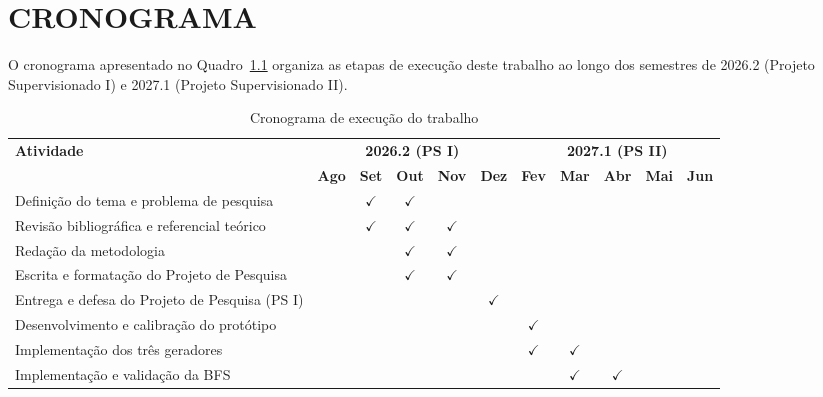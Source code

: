 \chapter{CRONOGRAMA}
\label{cap:cronograma}

O cronograma apresentado no Quadro~\ref{qua:cronograma} organiza as etapas de 
execução deste trabalho ao longo dos semestres de 2026.2 
(Projeto Supervisionado I) e 2027.1 (Projeto Supervisionado II).

\begin{table}[htb]
\caption{Cronograma de execução do trabalho}
\label{qua:cronograma}

\renewcommand{\arraystretch}{1.4}
\begin{tabularx}{\textwidth}{|X|c|c|c|c|c|c|c|c|c|c|}
  \hline
  \multirow{2}{*}{\textbf{Atividade}} &
  \multicolumn{5}{c|}{\textbf{2026.2 (PS I)}} &
  \multicolumn{5}{c|}{\textbf{2027.1 (PS II)}} \\
  \cline{2-11}
  & \textbf{Ago} & \textbf{Set} & \textbf{Out} & \textbf{Nov} & \textbf{Dez}
  & \textbf{Fev} & \textbf{Mar} & \textbf{Abr} & \textbf{Mai} & \textbf{Jun} \\
  \hline

  Definição do tema e problema de pesquisa
  & & $\checkmark$ & $\checkmark$  & & & & & & & \\
  \hline

  Revisão bibliográfica e referencial teórico
  & & $\checkmark$ & $\checkmark$ & $\checkmark$ & & & & & & \\
  \hline

  Redação da metodologia
  & & & $\checkmark$ & $\checkmark$  & & & & & & \\
  \hline

  Escrita e formatação do Projeto de Pesquisa
  & & & $\checkmark$ & $\checkmark$ & & & & & & \\
  \hline

  Entrega e defesa do Projeto de Pesquisa (PS I)
  & & & & & $\checkmark$ & & & & & \\
  \hline

  Desenvolvimento e calibração do protótipo
  & & & & & & $\checkmark$ & & & & \\
  \hline

  Implementação dos três geradores
  & & & & & & $\checkmark$ & $\checkmark$ & & & \\
  \hline

  Implementação e validação da BFS
  & & & & & & & $\checkmark$ & $\checkmark$ & & \\
  \hline


\end{tabularx}
\end{table}
